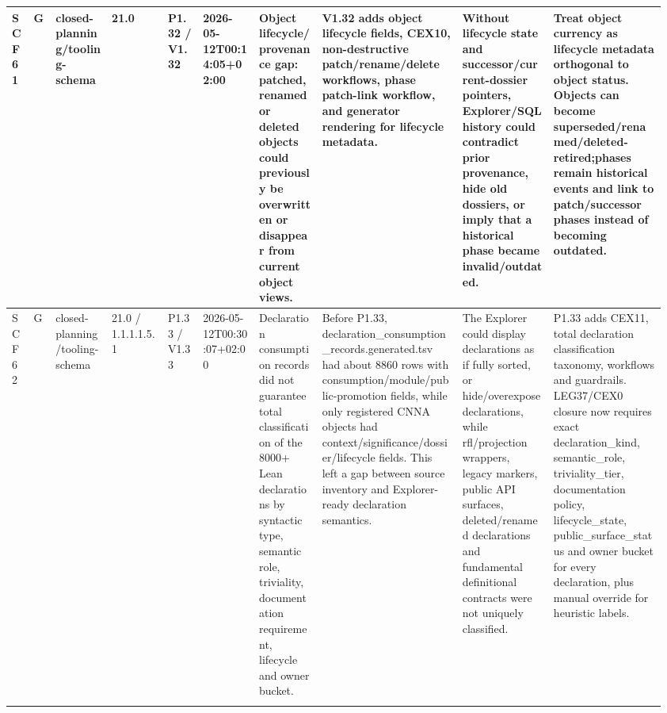 \begin{longtable}{L{0.03\linewidth} L{0.026\linewidth} L{0.087\linewidth} L{0.085\linewidth} L{0.052\linewidth} L{0.085\linewidth} L{0.095\linewidth} L{0.205\linewidth} L{0.13\linewidth} L{0.165\linewidth}}
SCF61 & G & closed-planning/\allowbreak{}tooling-schema & 21.0 & P1.32 /\allowbreak{} V1.32 & 2026-05-12T00:14:05+02:00 & Object lifecycle/\allowbreak{}provenance gap: patched, renamed or deleted objects could previously be overwritten or disappear from current object views. & V1.32 adds object lifecycle fields, CEX10, non-destructive patch/\allowbreak{}rename/\allowbreak{}delete workflows, phase patch-link workflow, and generator rendering for lifecycle metadata. & Without lifecycle state and successor/\allowbreak{}current-dossier pointers, Explorer/\allowbreak{}SQL history could contradict prior provenance, hide old dossiers, or imply that a historical phase became invalid/\allowbreak{}outdated. & Treat object currency as lifecycle metadata orthogonal to object status. Objects can become superseded/\allowbreak{}renamed/\allowbreak{}deleted-retired;\newline phases remain historical events and link to patch/\allowbreak{}successor phases instead of becoming outdated.\\
\hline
\addlinespace[0.24em]
SCF62 & G & closed-planning/\allowbreak{}tooling-schema & 21.0 /\allowbreak{} 1.1.1.1.5.1 & P1.33 /\allowbreak{} V1.33 & 2026-05-12T00:30:07+02:00 & Declaration consumption records did not guarantee total classification of the 8000+ Lean declarations by syntactic type, semantic role, triviality, documentation requirement, lifecycle and owner bucket. & Before P1.33, declaration\_consumption\_records.generated.tsv had about 8860 rows with consumption/\allowbreak{}module/\allowbreak{}public-promotion fields, while only registered CNNA objects had context/\allowbreak{}significance/\allowbreak{}dossier/\allowbreak{}lifecycle fields. This left a gap between source inventory and Explorer-ready declaration semantics. & The Explorer could display declarations as if fully sorted, or hide/\allowbreak{}overexpose declarations, while rfl/\allowbreak{}projection wrappers, legacy markers, public API surfaces, deleted/\allowbreak{}renamed declarations and fundamental definitional contracts were not uniquely classified. & P1.33 adds CEX11, total declaration classification taxonomy, workflows and guardrails. LEG37/\allowbreak{}CEX0 closure now requires exact declaration\_kind, semantic\_role, triviality\_tier, documentation policy, lifecycle\_state, public\_surface\_status and owner bucket for every declaration, plus manual override for heuristic labels.\\
\hline
\addlinespace[0.24em]

\end{longtable}
